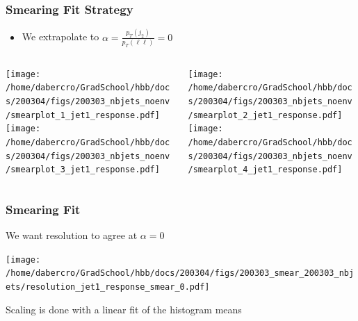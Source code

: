 \documentclass{beamer}
\begin{document}
\begin{frame}
  \frametitle{Smearing Fit Strategy}

  \begin{itemize}
  \item We extrapolate to $\alpha = \frac{p_T(j_2)}{p_T(\ell\ell)} = 0$
  \end{itemize}

  \begin{columns}
    \begin{column}{0.3\linewidth}
      \centering
      \texttt{[image: /home/dabercro/GradSchool/hbb/docs/200304/figs/200303\_nbjets\_noenv/smearplot\_1\_jet1\_response.pdf]} \\
      \texttt{[image: /home/dabercro/GradSchool/hbb/docs/200304/figs/200303\_nbjets\_noenv/smearplot\_3\_jet1\_response.pdf]}
    \end{column}
    \begin{column}{0.3\linewidth}
      \centering
      \texttt{[image: /home/dabercro/GradSchool/hbb/docs/200304/figs/200303\_nbjets\_noenv/smearplot\_2\_jet1\_response.pdf]} \\
      \texttt{[image: /home/dabercro/GradSchool/hbb/docs/200304/figs/200303\_nbjets\_noenv/smearplot\_4\_jet1\_response.pdf]}
    \end{column}
  \end{columns}

\end{frame}


\begin{frame}
  \frametitle{Smearing Fit}

  We want resolution to agree at $\alpha = 0$

  \vfill

  \begin{center}
    \texttt{[image: /home/dabercro/GradSchool/hbb/docs/200304/figs/200303\_smear\_200303\_nbjets/resolution\_jet1\_response\_smear\_0.pdf]}
  \end{center}

  \vfill

  Scaling is done with a linear fit of the histogram means

\end{frame}
\end{document}
